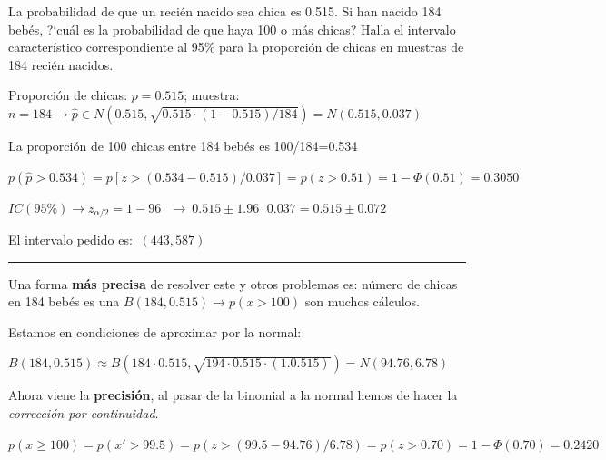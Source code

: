 \vspace{5mm} %
\begin{ejemplo}
\begin{ejer}
	La probabilidad de que un recién nacido sea chica es 0.515. Si han nacido 184 bebés, ?`cuál es la probabilidad de que haya 100 o más chicas? 
Halla el intervalo característico correspondiente al 95\% para la proporción de chicas en muestras de 184 recién nacidos. 
\end{ejer}	
\end{ejemplo}

\vspace{2mm} Proporción de chicas: $p=0.515$; muestra: $n=184 \to \widehat p \in N(0.515,\sqrt{0.515\cdot (1-0.515)/184})=N(0.515,0.037)$

\vspace{2mm} La proporción de 100 chicas entre 184 bebés es 100/184=0.534

\vspace{2mm} $p(\hat p>0.534)=p[z>(0.534-0.515)/0.037]=p(z>0.51)=1-\Phi(0.51)=0.3050$

\vspace{2mm} $IC(95\%) \to z_{\alpha/2}=1-96 \:\ \  \to \ 0.515\pm 1.96 \cdot 0.037 =0.515 \pm 0.072$

\vspace{2mm} El intervalo pedido es: $\ (443,587)$

\rule{150pt}{0.1pt}

\vspace{2mm} Una forma \textbf{más precisa} de resolver este y otros problemas es: número de chicas en 184 bebés es una $B(184,0.515) \to p(x>100)$ son muchos cálculos.

\vspace{2mm} Estamos en condiciones de aproximar por la normal:

\vspace{2mm} $B(184,0.515) \approx B(184\cdot 0.515, \sqrt{194\cdot 0.515 \cdot (1.0.515)})=N(94.76,6.78)$

\vspace{2mm} Ahora viene la \textbf{precisión}, al pasar de la binomial a la normal hemos de hacer la \emph{corrección por continuidad}.

\vspace{2mm} $p(x\ge 100)=p(x'>99.5)=p(z>(99.5-94.76)/6.78)=p(z>0.70)=1-\Phi(0.70)=0.2420$


